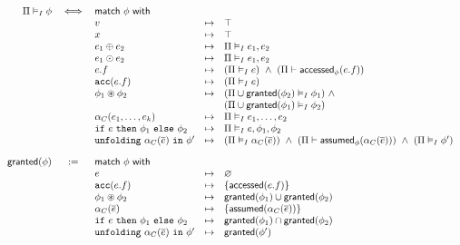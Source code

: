 \begin{align*}
\begin{array}{rclcl}
\Pi \frames \phi &\iff& \tsf{match} \ \phi \ \tsf{with} &&
\\
&& v &\mt&
  \top
\\
&& x &\mt&
  \top
\\
&& e_1 \oplus e_2 &\mt&
  \Pi \frames e_1, e_2
\\
&& e_1 \odot e_2 &\mt&
  \Pi \frames e_1, e_2
\\
&& e.f &\mt&
  (\Pi \frames e) \ \land \ (\Pi \entails \accessed_\phi(e.f))
\\
&& \cacc(e.f) &\mt&
  (\Pi \frames e)
\\
&& \phi_1 \circledast \phi_2 &\mt&
  (\Pi \cup \granted(\phi_2) \frames \phi_1) \ \land \\ &&&&
  (\Pi \cup \granted(\phi_1) \frames \phi_2)
\\
&& \alpha_C(e_1, \dots, e_k) &\mt&
  \Pi \frames e_1, \dots, e_2
\\
&& \cif \ e \ \cthen \ \phi_1 \ \celse \ \phi_2 &\mt&
  \Pi \frames e, \phi_1, \phi_2
\\
&& \cunfolding \ \alpha_C(\vec{e}) \ \cin \ \phi\p &\mt&
  (\Pi \frames \alpha_C(\vec{e})) \ \land \
  (\Pi \entails \assumed_\phi(\alpha_C(\vec{e}))) \ \land \
  (\Pi \frames \phi\p)
%
\\[1em]
%
\granted(\phi) &:=& \tsf{match} \ \phi \ \tsf{with} &&
\\
&& e &\mt&
  \empty
\\
&& \cacc(e.f) &\mt&
  \set{ \accessed(e.f) }
\\
&& \phi_1 \circast \phi_2 &\mt&
  \granted(\phi_1) \cup \granted(\phi_2)
\\
&& \alpha_C(\vec{e}) &\mt&
  \set{ \assumed(\alpha_C(\vec{e})) }
\\
&& \cif \ e \ \cthen \ \phi_1 \ \celse \ \phi_2 &\mt&
  \granted(\phi_1) \cap \granted(\phi_2)
\\
&& \cunfolding \ \alpha_C(\vec{e}) \ \cin \ \phi\p &\mt&
  \granted(\phi\p)
\end{array}
\end{align*}

